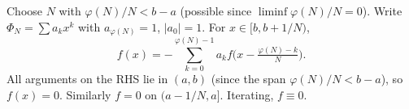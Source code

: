 \documentclass{article}
\begin{document}
Choose $N$ with $\varphi(N)/N < b - a$ (possible since $\liminf \varphi(N)/N = 0$). Write $\Phi_N = \sum a_k x^k$ with $a_{\varphi(N)} = 1$, $|a_0| = 1$. For $x \in [b, b + 1/N)$,
\[
f(x) = -\sum_{k=0}^{\varphi(N)-1} a_k f\!\bigl(x - \tfrac{\varphi(N) - k}{N}\bigr).
\]
All arguments on the RHS lie in $(a, b)$ (since the span $\varphi(N)/N < b - a$), so $f(x) = 0$. Similarly $f = 0$ on $(a - 1/N, a]$. Iterating, $f \equiv 0$.
\end{document}
